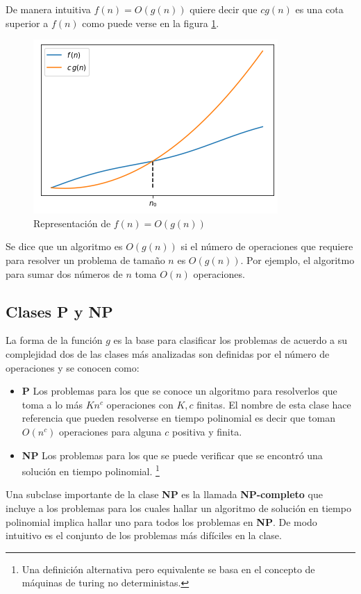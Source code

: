 De manera intuitiva $f(n)=O(g(n))$ quiere decir que $cg(n)$ es una cota superior a $f(n)$ como puede verse en la figura \ref{fig:bigo}.
\begin{figure}[H]
    \centering
    \includegraphics[scale=.8]{Imagenes/bigo.png}
    \caption{Representación de $f(n)= O(g(n))$}
    \label{fig:bigo}
\end{figure}
Se dice que un algoritmo es $O(g(n))$ si el número de operaciones que requiere para resolver un problema de tamaño $n$ es $O(g(n))$. Por ejemplo, el algoritmo para sumar dos números de $n$ toma $O(n)$ operaciones. 

\subsection*{Clases \textbf{P} y \textbf{NP}}
La forma de la función $g$ es la base para clasificar los problemas de acuerdo a su complejidad dos de las clases más analizadas son definidas por el número de operaciones y se conocen como:
\begin{itemize} 
    \item \textbf{P} Los problemas para los que se conoce un algoritmo para resolverlos que toma a lo más $Kn^c$ operaciones con $K,c$ finitas. El nombre de esta clase hace referencia que pueden resolverse en tiempo polinomial es decir que toman $O(n^c)$ operaciones para alguna $c$ positiva y finita. 
    \item \textbf{NP} Los problemas para los que se puede verificar que se encontró una solución en tiempo polinomial. \footnote{Una definición alternativa pero equivalente se basa en el concepto de máquinas de turing no deterministas.}
\end{itemize}

Una subclase importante de la clase \textbf{NP} es la llamada \textbf{NP-completo} que incluye a los problemas para los cuales hallar un algoritmo de solución en tiempo polinomial implica hallar uno para todos los problemas en \textbf{NP}. De modo intuitivo es el conjunto de los problemas más difíciles en la clase.

